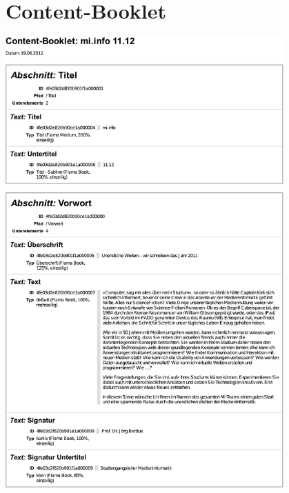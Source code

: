 \section{Content-Booklet}\label{l:booklet}

\begin{center}
\includegraphics[width=0.80\textwidth]{media/contentbooklet.pdf}
\end{center}